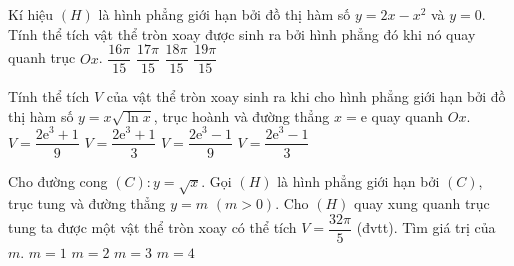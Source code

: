 \begin{vd}%
	Kí hiệu $(H)$ là hình phẳng giới hạn bởi đồ thị hàm số $y=2x-x^2$ và $y=0$. Tính thể tích vật thể tròn xoay được sinh ra bởi hình phẳng đó khi nó quay quanh trục $Ox$. 
	\choice
	{\True $\dfrac{16\pi}{15}$}
	{$\dfrac{17\pi}{15}$}
	{$\dfrac{18\pi}{15}$}
	{$\dfrac{19\pi}{15}$}
\end{vd}

\begin{vd}%
	Tính thể tích $V$ của vật thể tròn xoay sinh ra khi cho hình phẳng giới hạn bởi đồ thị hàm số $y=x\sqrt{\ln x}$, trục hoành và đường thẳng $x=\mathrm{e}$ quay quanh $Ox$.
	\choice
	{\True $V=\dfrac{2\mathrm{e}^3+1}{9}$}
	{$V=\dfrac{2\mathrm{e}^3+1}{3}$}
	{$V=\dfrac{2\mathrm{e}^3-1}{9}$}
	{$V=\dfrac{2\mathrm{e}^3-1}{3}$}
\end{vd}

\begin{vd}%
	Cho đường cong $(C)\colon y=\sqrt{x}$. Gọi $(H)$ là hình phẳng giới hạn bởi $(C)$, trục tung và đường thẳng $y=m$ $(m>0)$. Cho $(H)$ quay xung quanh trục tung ta được một vật thể tròn xoay có thể tích $V=\dfrac{32\pi}{5}$ (đvtt). Tìm giá trị của $m$. 
	\choice
	{$m=1$}
	{\True $m=2$}
	{$m=3$}
	{$m=4$}
\end{vd}

